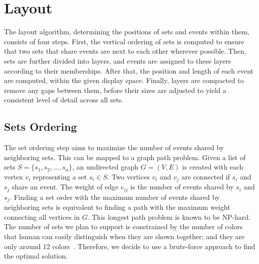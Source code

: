 \section{Layout}
\label{sec:ts-algorithm}
The layout algorithm, determining the positions of sets and events within them,  consists of four steps. First, the vertical ordering of sets is computed to ensure that two sets that share events are next to each other wherever possible. Then, sets are further divided into layers, and events are assigned to these layers according to their memberships. After that, the position and length of each event are computed, within the given display space. Finally, layers are compacted to remove any gaps between them, before their sizes are adjusted to yield a consistent level of detail across all sets.

\subsection{Sets Ordering}
\label{sec:set-ordering}
The set ordering step aims to maximize the number of events shared by neighboring sets. This can be mapped to a graph path problem. Given a list of sets $S=\{s_1, s_2, \dotsc, s_n\}$, an undirected graph $G = (V,E)$ is created with each vertex $v_i$ representing a set $s_i \in S$. Two vertices $v_i$ and $v_j$ are connected if $s_i$ and $s_j$ share an event. The weight of edge $e_{ij}$ is the number of events shared by $s_i$ and $s_j$. Finding a set order with the maximum number of events shared by neighboring sets is equivalent to finding a path with the maximum weight connecting all vertices in $G$. This longest path problem is known to be NP-hard. The number of sets we plan to support is constrained by the number of colors that human can easily distinguish when they are shown together; and they are only around 12 colors~\cite{Munzner2014}. Therefore, we decide to use a brute-force approach to find the optimal solution.

